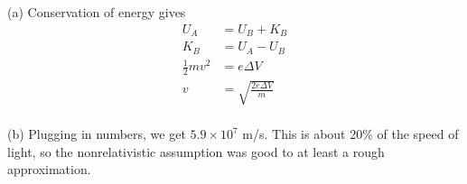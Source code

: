 (a) Conservation of energy gives
\begin{align*}
        U_A             &= U_B+K_B\\
        K_B             &= U_A-U_B\\
        \frac{1}{2}mv^2 &= e\Delta V\\
        v &= \sqrt{\frac{2e\Delta V}{m}}
\end{align*}\\
(b) Plugging in numbers, we get $5.9\times10^7$ m/s. This is about
20\% of the speed of light, so the nonrelativistic assumption
was good to at least a rough approximation.

